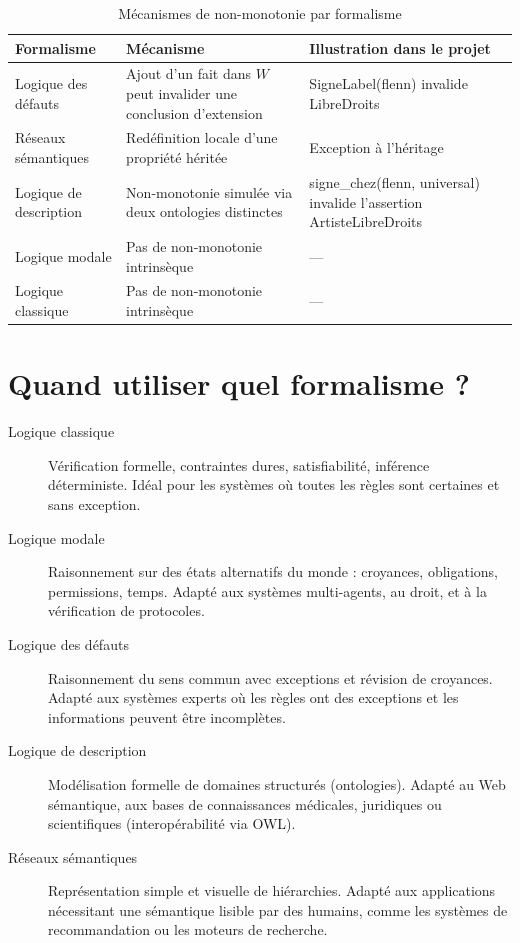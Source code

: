 \begin{table}[H]
\centering
\caption{Mécanismes de non-monotonie par formalisme}
\begin{tabularx}{\linewidth}{lXX}
\toprule
\textbf{Formalisme} & \textbf{Mécanisme} & \textbf{Illustration dans le projet} \\
\midrule
Logique des défauts
  & Ajout d'un fait dans $W$ peut invalider une conclusion d'extension
  & SigneLabel(flenn) invalide LibreDroits \\
Réseaux sémantiques
  & Redéfinition locale d'une propriété héritée
  & Exception à l'héritage \\
Logique de description
  & Non-monotonie simulée via deux ontologies distinctes
  & signe\_chez(flenn, universal) invalide l'assertion ArtisteLibreDroits \\
Logique modale
  & Pas de non-monotonie intrinsèque
  & --- \\
Logique classique
  & Pas de non-monotonie intrinsèque
  & --- \\
\bottomrule
\end{tabularx}
\end{table}

\section{Quand utiliser quel formalisme ?}

\begin{description}
  \item[Logique classique] Vérification formelle, contraintes dures,
        satisfiabilité, inférence déterministe. Idéal pour les systèmes
        où toutes les règles sont certaines et sans exception.

  \item[Logique modale] Raisonnement sur des états alternatifs du monde :
        croyances, obligations, permissions, temps. Adapté aux systèmes
        multi-agents, au droit, et à la vérification de protocoles.

  \item[Logique des défauts] Raisonnement du sens commun avec exceptions et
        révision de croyances. Adapté aux systèmes experts où les règles ont
        des exceptions et les informations peuvent être incomplètes.

  \item[Logique de description] Modélisation formelle de domaines structurés
        (ontologies). Adapté au Web sémantique, aux bases de connaissances
        médicales, juridiques ou scientifiques (interopérabilité via OWL).

  \item[Réseaux sémantiques] Représentation simple et visuelle de hiérarchies.
        Adapté aux applications nécessitant une sémantique lisible par des
        humains, comme les systèmes de recommandation ou les moteurs de recherche.
\end{description}

